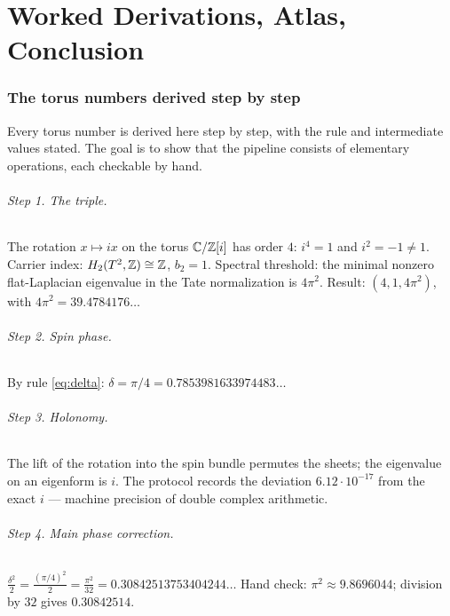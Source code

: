 \part{Worked Derivations, Atlas, Conclusion}

\section{The torus numbers derived step by step}\label{sec:worktorus}

Every torus number is derived here step by step, with the rule and
intermediate values stated. The goal is to show that the pipeline
consists of elementary operations, each checkable by hand.

\paragraph{Step 1. The triple.} The rotation $x\mapsto ix$ on the
torus $\mathbb{C}/\mathbb{Z}[i]$ has order $4$: $i^4=1$ and $i^2=-1\ne1$. Carrier
index: $H_2(T^2,\mathbb{Z})\cong\mathbb{Z}$, $b_2=1$. Spectral threshold: the
minimal nonzero flat-Laplacian eigenvalue in the Tate normalization
is $4\pi^2$. Result: $(4,1,4\pi^2)$, with
$4\pi^2=39.4784176\ldots$

\paragraph{Step 2. Spin phase.} By rule \eqref{eq:delta}:
$\delta=\pi/4=0.7853981633974483\ldots$

\paragraph{Step 3. Holonomy.} The lift of the rotation into the spin
bundle permutes the sheets; the eigenvalue on an eigenform is $i$.
The protocol records the deviation $6.12\cdot10^{-17}$ from the
exact $i$ --- machine precision of double complex arithmetic.

\paragraph{Step 4. Main phase correction.}
$\frac{\delta^2}{2}=\frac{(\pi/4)^2}{2}=\frac{\pi^2}{32}
=0.30842513753404244\ldots$ Hand check:
$\pi^2\approx9.8696044$; division by $32$ gives $0.30842514$.

